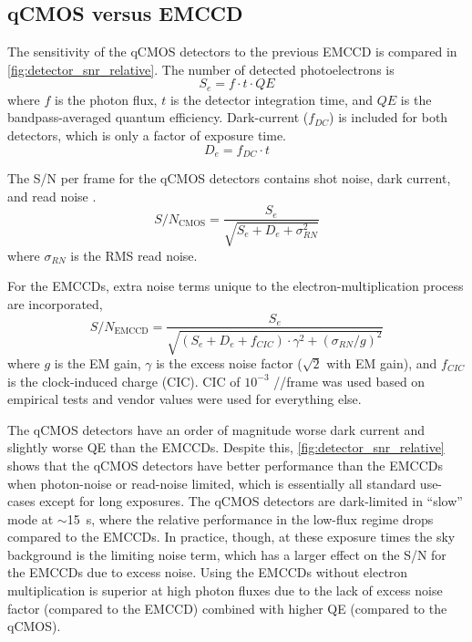 \subsection{qCMOS versus EMCCD}

The sensitivity of the qCMOS detectors to the previous EMCCD is compared in \autoref{fig:detector_snr_relative}. The number of detected photoelectrons is
\begin{equation}
    S_e = f \cdot t \cdot QE
\end{equation}
where $f$ is the photon flux, $t$ is the detector integration time, and $QE$ is the bandpass-averaged quantum efficiency. Dark-current ($f_{DC}$) is included for both detectors, which is only a factor of exposure time.
\begin{equation}
    D_e = f_{DC} \cdot t
\end{equation}

The S/N per frame for the qCMOS detectors contains shot noise, dark current, and read noise \citep{janesick_photon_2007,stefanov_cmos_2022}.
\begin{equation}
    S/N_\mathrm{CMOS} = \frac{S_e}{\sqrt{S_e + D_e + \sigma_{RN}^2}}
\end{equation}
where $\sigma_{RN}$ is the RMS read noise.

For the EMCCDs, extra noise terms unique to the electron-multiplication process \citep{harpsoe_bayesian_2012} are incorporated,
\begin{equation}
    S/N_\mathrm{EMCCD} = \frac{S_e}{\sqrt{\left(S_e + D_e + f_{CIC}\right) \cdot \gamma^2 + \left(\sigma_{RN}/g\right)^2}}
\end{equation}
where $g$ is the EM gain, $\gamma$ is the excess noise factor ($\sqrt{2}$ with EM gain), and $f_{CIC}$ is the clock-induced charge (CIC). CIC of $10^{-3}$ \si{\electron/\pixel/frame} was used based on empirical tests and vendor values were used for everything else.

The qCMOS detectors have an order of magnitude worse dark current and slightly worse QE than the EMCCDs. Despite this, \autoref{fig:detector_snr_relative} shows that the qCMOS detectors have better performance than the EMCCDs when photon-noise or read-noise limited, which is essentially all standard use-cases except for long exposures. The qCMOS detectors are dark-limited in ``slow'' mode at $\sim$\SI{15}{s}, where the relative performance in the low-flux regime drops compared to the EMCCDs. In practice, though, at these exposure times the sky background is the limiting noise term, which has a larger effect on the S/N for the EMCCDs due to excess noise. Using the EMCCDs without electron multiplication is superior at high photon fluxes due to the lack of excess noise factor (compared to the EMCCD) combined with higher QE (compared to the qCMOS).

